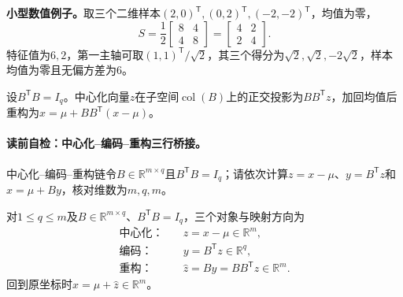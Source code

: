\label{struct:V4-C04-CH18}
\textbf{小型数值例子。}取三个二维样本$(2,0)^{\mathsf T},(0,2)^{\mathsf T},(-2,-2)^{\mathsf T}$，均值为零，
\[
S=\frac12\begin{bmatrix}8&4\\4&8\end{bmatrix}
=\begin{bmatrix}4&2\\2&4\end{bmatrix}.
\]
特征值为$6,2$，第一主轴可取$(1,1)^{\mathsf T}/\sqrt2$，其三个得分为$\sqrt2,\sqrt2,-2\sqrt2$，样本均值为零且无偏方差为$6$。

设$B^{\mathsf T}B=I_q$。中心化向量$z$在子空间$\operatorname{col}(B)$上的正交投影为$BB^{\mathsf T}z$，加回均值后重构为$\widehat x=\mu+BB^{\mathsf T}(x-\mu)$。

\paragraph{读前自检：中心化--编码--重构三行桥接。}中心化--编码--重构链令$B\in\mathbb R^{m\times q}$且$B^{\mathsf T}B=I_q$；请依次计算$z=x-\mu$、$y=B^{\mathsf T}z$和$\widehat x=\mu+By$，核对维数为$m,q,m$。\par

\begin{keypointbox}[title=中心化--编码--重构三行桥接]
对$1\leq q\leq m$及$B\in\mathbb R^{m\times q}$、$B^{\mathsf T}B=I_q$，三个对象与映射方向为
\[
\begin{aligned}
\text{中心化：}\quad & z=x-\mu\in\mathbb R^m,\\
\text{编码：}\quad & y=B^{\mathsf T}z\in\mathbb R^q,\\
\text{重构：}\quad & \widehat z=By=BB^{\mathsf T}z\in\mathbb R^m.
\end{aligned}
\]
回到原坐标时$\widehat x=\mu+\widehat z\in\mathbb R^m$。
\end{keypointbox}


